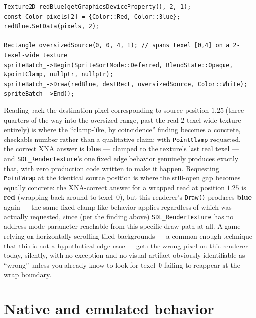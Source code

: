 \begin{lstlisting}
Texture2D redBlue(getGraphicsDeviceProperty(), 2, 1);
const Color pixels[2] = {Color::Red, Color::Blue};
redBlue.SetData(pixels, 2);

Rectangle oversizedSource(0, 0, 4, 1); // spans texel [0,4] on a 2-texel-wide texture
spriteBatch_->Begin(SpriteSortMode::Deferred, BlendState::Opaque, &pointClamp, nullptr, nullptr);
spriteBatch_->Draw(redBlue, destRect, oversizedSource, Color::White);
spriteBatch_->End();
\end{lstlisting}

Reading back the destination pixel corresponding to source position $1.25$ (three-quarters of
the way into the oversized range, past the real 2-texel-wide texture entirely) is where the
``clamp-like, by coincidence'' finding becomes a concrete, checkable number rather than a
qualitative claim: with \texttt{PointClamp} requested, the correct XNA answer is
\textbf{blue} --- clamped to the texture's last real texel --- and \texttt{SDL\_RenderTexture}'s
one fixed edge behavior genuinely produces exactly that, with zero production code written to
make it happen. Requesting \texttt{PointWrap} at the identical source position is where the
still-open gap becomes equally concrete: the XNA-correct answer for a wrapped read at position
$1.25$ is \textbf{red} (wrapping back around to texel~0), but this renderer's \texttt{Draw()}
produces \textbf{blue} again --- the same fixed clamp-like behavior applies regardless of which
 was actually requested, since (per the finding above)
\texttt{SDL\_RenderTexture} has no address-mode parameter reachable from this specific draw
path at all. A game relying on horizontally-scrolling tiled backgrounds --- a common enough
technique that this is not a hypothetical edge case --- gets the wrong pixel on this renderer
today, silently, with no exception and no visual artifact obviously identifiable as ``wrong''
unless you already know to look for texel~0 failing to reappear at the wrap boundary.

\section{Native and emulated behavior}

